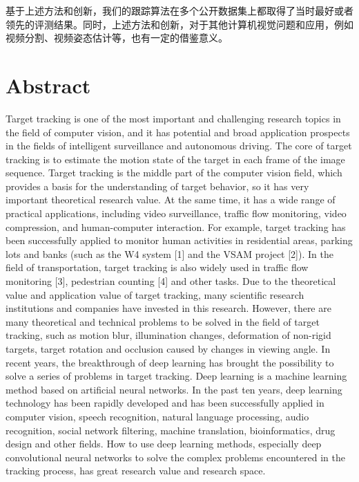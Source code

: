 基于上述方法和创新，我们的跟踪算法在多个公开数据集上都取得了当时最好或者领先的评测结果。同时，上述方法和创新，对于其他计算机视觉问题和应用，例如视频分割、视频姿态估计等，也有一定的借鉴意义。

\intobmk\chapter*{Abstract}%

Target tracking is one of the most important and challenging research topics in the field of computer vision, and it has potential and broad application prospects in the fields of intelligent surveillance and autonomous driving. The core of target tracking is to estimate the motion state of the target in each frame of the image sequence. Target tracking is the middle part of the computer vision field, which provides a basis for the understanding of target behavior, so it has very important theoretical research value. At the same time, it has a wide range of practical applications, including video surveillance, traffic flow monitoring, video compression, and human-computer interaction. For example, target tracking has been successfully applied to monitor human activities in residential areas, parking lots and banks (such as the W4 system [1] and the VSAM project [2]). In the field of transportation, target tracking is also widely used in traffic flow monitoring [3], pedestrian counting [4] and other tasks.
Due to the theoretical value and application value of target tracking, many scientific research institutions and companies have invested in this research. However, there are many theoretical and technical problems to be solved in the field of target tracking, such as motion blur, illumination changes, deformation of non-rigid targets, target rotation and occlusion caused by changes in viewing angle. In recent years, the breakthrough of deep learning has brought the possibility to solve a series of problems in target tracking.
Deep learning is a machine learning method based on artificial neural networks. In the past ten years, deep learning technology has been rapidly developed and has been successfully applied in computer vision, speech recognition, natural language processing, audio recognition, social network filtering, machine translation, bioinformatics, drug design and other fields. How to use deep learning methods, especially deep convolutional neural networks to solve the complex problems encountered in the tracking process, has great research value and research space.

